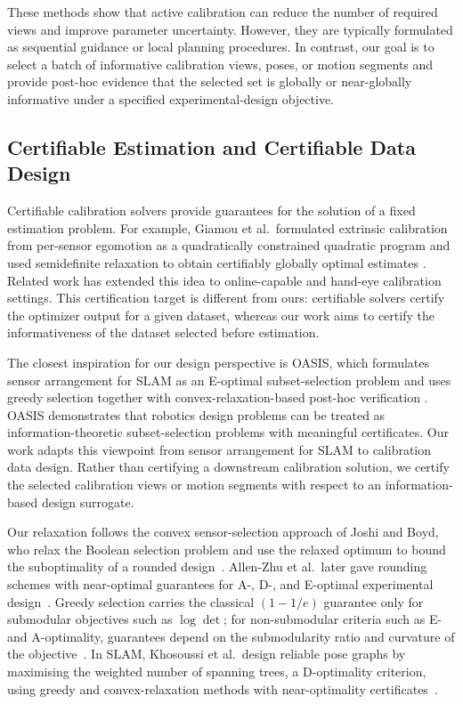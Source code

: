 \documentclass[letterpaper, 9
 pt, conference]{ieeeconf}
\begin{document}
These methods show that active calibration can reduce the number of required
views and improve parameter uncertainty. However, they are typically formulated
as sequential guidance or local planning procedures. In contrast, our goal is
to select a batch of informative calibration views, poses, or motion segments
and provide post-hoc evidence that the selected set is globally or
near-globally informative under a specified experimental-design objective.

\subsection{Certifiable Estimation and Certifiable Data Design}
Certifiable calibration solvers provide guarantees for the solution of a fixed
estimation problem. For example, Giamou et al.\ formulated extrinsic
calibration from per-sensor egomotion as a quadratically constrained quadratic
program and used semidefinite relaxation to obtain certifiably globally optimal
estimates \citep{giamou2019certifiable}. Related work has extended this idea to
online-capable and hand-eye calibration settings. This certification target is
different from ours: certifiable solvers certify the optimizer output for a
given dataset, whereas our work aims to certify the informativeness of the
dataset selected before estimation.

The closest inspiration for our design perspective is OASIS, which formulates
sensor arrangement for SLAM as an E-optimal subset-selection problem and uses
greedy selection together with convex-relaxation-based post-hoc verification
\citep{kaveti2023oasis}. OASIS demonstrates that robotics design problems can
be treated as information-theoretic subset-selection problems with meaningful
certificates. Our work adapts this viewpoint from sensor arrangement for SLAM
to calibration data design. Rather than certifying a downstream calibration
solution, we certify the selected calibration views or motion segments with
respect to an information-based design surrogate.

Our relaxation follows the convex sensor-selection approach of Joshi and Boyd,
who relax the Boolean selection problem and use the relaxed optimum to bound
the suboptimality of a rounded design~\citep{joshi2009sensor}.
Allen-Zhu et al.\ later gave rounding schemes with near-optimal guarantees for
A-, D-, and E-optimal experimental design~\citep{allenzhu2017near}.
Greedy selection carries the classical $(1-1/e)$ guarantee only for submodular
objectives such as $\log\det$; for non-submodular criteria such as E- and
A-optimality, guarantees depend on the submodularity ratio and curvature of the
objective~\citep{bian2017guarantees}.
In SLAM, Khosoussi et al.\ design reliable pose graphs by maximising the
weighted number of spanning trees, a D-optimality criterion, using greedy and
convex-relaxation methods with near-optimality certificates~\citep{khosoussi2019reliable}.
\end{document}
